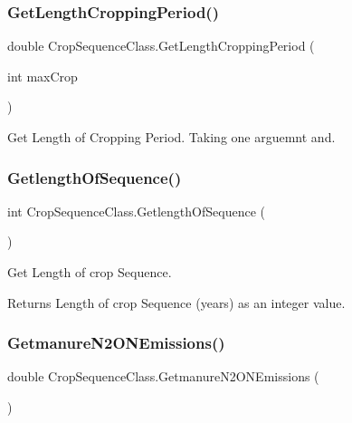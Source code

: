\subsubsection{\texorpdfstring{GetLengthCroppingPeriod()}{GetLengthCroppingPeriod()}}
{\footnotesize\ttfamily double Crop\+Sequence\+Class.\+Get\+Length\+Cropping\+Period (\begin{DoxyParamCaption}\item[{int}]{max\+Crop }\end{DoxyParamCaption})\hspace{0.3cm}{\ttfamily [inline]}}



Get Length of Cropping Period. Taking one arguemnt and. 

\mbox{\label{class_crop_sequence_class_aab561714ad5498801165de8087d24d16}} 
\subsubsection{\texorpdfstring{GetlengthOfSequence()}{GetlengthOfSequence()}}
{\footnotesize\ttfamily int Crop\+Sequence\+Class.\+Getlength\+Of\+Sequence (\begin{DoxyParamCaption}{ }\end{DoxyParamCaption})\hspace{0.3cm}{\ttfamily [inline]}}



Get Length of crop Sequence. 

\begin{DoxyReturn}{Returns}
Length of crop Sequence (years) as an integer value. 
\end{DoxyReturn}
\mbox{\label{class_crop_sequence_class_a16586cb2650f4022d7845851eb8a7543}} 
\subsubsection{\texorpdfstring{GetmanureN2ONEmissions()}{GetmanureN2ONEmissions()}\hspace{0.1cm}{\footnotesize\ttfamily [1/2]}}
{\footnotesize\ttfamily double Crop\+Sequence\+Class.\+Getmanure\+N2\+O\+N\+Emissions (\begin{DoxyParamCaption}{ }\end{DoxyParamCaption})\hspace{0.3cm}{\ttfamily [inline]}}



